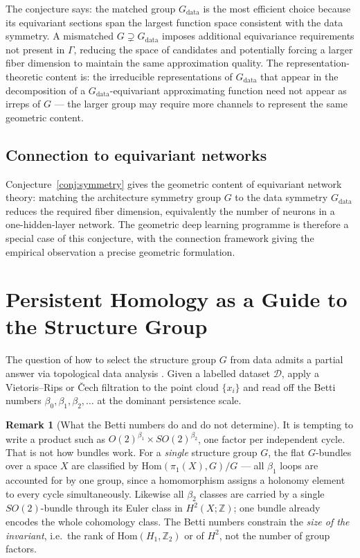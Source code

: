 \documentclass[11pt, a4paper]{article}
\theoremstyle{plain}
\theoremstyle{definition}
\newtheorem{remark}[theorem]{Remark}
\newcommand{\Gam}{\Gamma}
\begin{document}
The conjecture says: the matched group $G_{\mathrm{data}}$ is the most efficient
choice because its equivariant sections span the largest function space consistent
with the data symmetry. A mismatched $G \supsetneq G_{\mathrm{data}}$ imposes
additional equivariance requirements not present in $\Gam$, reducing the space of
candidates and potentially forcing a larger fiber dimension to maintain the same
approximation quality. The representation-theoretic content is: the irreducible
representations of $G_{\mathrm{data}}$ that appear in the decomposition of a
$G_{\mathrm{data}}$-equivariant approximating function need not appear as
irreps of $G$ — the larger group may require more channels to represent the
same geometric content.

\subsection{Connection to equivariant networks}

Conjecture~\ref{conj:symmetry} gives the geometric content of equivariant network
theory: matching the architecture symmetry group $G$ to the data symmetry
$G_{\mathrm{data}}$ reduces the required fiber dimension, equivalently the
number of neurons in a one-hidden-layer network. The geometric deep learning
programme \cite{bronstein2021} is therefore a special case of this conjecture, with the connection
framework giving the empirical observation a precise geometric formulation.

\section{Persistent Homology as a Guide to the Structure Group}\label{sec:tda}

The question of how to select the structure group $G$ from data admits a partial
answer via topological data analysis \cite{edelsbrunner2010}. Given a labelled dataset $\mathcal{D}$, apply
a Vietoris--Rips or \v{C}ech filtration to the point cloud $\{x_i\}$ and read off
the Betti numbers $\beta_0, \beta_1, \beta_2, \ldots$ at the dominant persistence
scale.

\begin{remark}[What the Betti numbers do and do not determine]\label{rem:tda-shape}
It is tempting to write a product such as
$O(2)^{\beta_1}\times SO(2)^{\beta_2}$, one factor per independent cycle. That is
not how bundles work. For a \emph{single} structure group $G$, the flat
$G$-bundles over a space $X$ are classified by $\mathrm{Hom}(\pi_1(X), G)/G$ ---
all $\beta_1$ loops are accounted for by one group, since a homomorphism assigns
a holonomy element to every cycle simultaneously. Likewise all $\beta_2$ classes
are carried by a single $SO(2)$-bundle through its Euler class in $H^2(X;\mathbb{Z})$;
one bundle already encodes the whole cohomology class. The Betti numbers
constrain the \emph{size of the invariant}, i.e.\ the rank of
$\mathrm{Hom}(H_1, \mathbb{Z}_2)$ or of $H^2$, not the number of group factors.
\end{remark}
\end{document}
